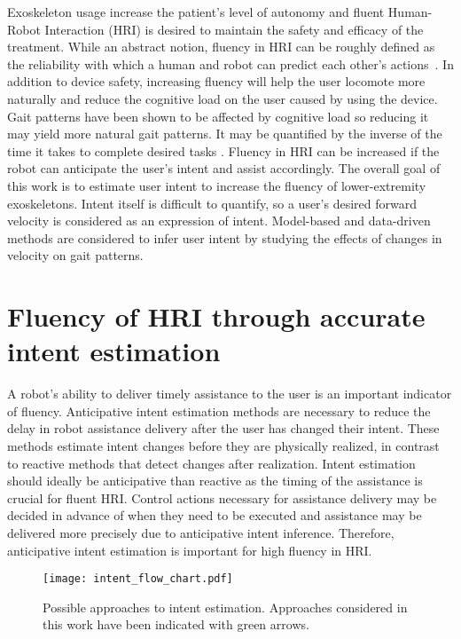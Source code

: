 Exoskeleton usage increase the patient's level of autonomy and fluent Human-Robot Interaction (HRI) is desired to maintain the safety and efficacy of the treatment. While an abstract notion, fluency in HRI can be roughly defined as the reliability with which a human and robot can predict each other's actions~\cite{hoffman2007cost}. In addition to device safety, increasing fluency will help the user locomote more naturally and reduce the cognitive load on the user caused by using the device. Gait patterns have been shown to be affected by cognitive load \cite{bogen2018walk} so reducing it may yield more natural gait patterns. It may be quantified by the inverse of the time it takes to complete desired tasks \cite{hoffman2019evaluating}. Fluency in HRI can be increased if the robot can anticipate the user's intent and assist accordingly. The overall goal of this work is to estimate user intent to increase the fluency of lower-extremity exoskeletons. Intent itself is difficult to quantify, so a user's desired forward velocity is considered as an expression of intent. Model-based and data-driven methods are considered to infer user intent by studying the effects of changes in velocity on gait patterns.

\section{Fluency of HRI through accurate intent estimation}

A robot's ability to deliver timely assistance to the user is an important indicator of fluency. Anticipative intent estimation methods are necessary to reduce the delay in robot assistance delivery after the user has changed their intent. These methods estimate intent changes before they are physically realized, in contrast to reactive methods that detect changes after realization. Intent estimation should ideally be anticipative than reactive as the timing of the assistance is crucial for fluent HRI. Control actions necessary for assistance delivery may be decided in advance of when they need to be executed and assistance may be delivered more precisely due to anticipative intent inference. Therefore, anticipative intent estimation is important for high fluency in HRI.

\begin{figure}
	\centering
	\texttt{[image: intent\_flow\_chart.pdf]}
	\caption{Possible approaches to intent estimation. Approaches considered in this work have been indicated with green arrows.}\label{fig:flow}
\end{figure}

